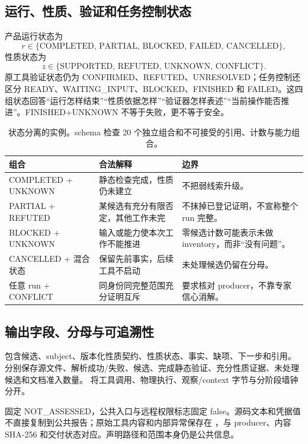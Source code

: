 \subsection{运行、性质、验证和任务控制状态}
产品运行状态为
\begin{equation}
r\in\{\text{COMPLETED, PARTIAL, BLOCKED, FAILED, CANCELLED}\},
\end{equation}
性质状态为
\begin{equation}
z\in\{\text{SUPPORTED, REFUTED, UNKNOWN, CONFLICT}\}.
\end{equation}
原工具验证状态仍为 CONFIRMED、REFUTED、UNRESOLVED；任务控制还区分 READY、WAITING\_INPUT、BLOCKED、FINISHED 和 FAILED。这四组状态回答“运行怎样结束”“性质依据怎样”“验证器怎样表述”“当前操作能否推进”。FINISHED+UNKNOWN 不等于失败，更不等于安全。

\begin{table}[htbp]\centering
\begin{tabularx}{\textwidth}{L{28mm}L{33mm}Y}
\toprule 组合 & 合法解释 & 边界\\\midrule
COMPLETED + UNKNOWN & 静态检查完成，性质仍未建立 & 不把弱线索升级。\\
PARTIAL + REFUTED & 某候选有充分有限否定，其他工作未完 & 不抹掉已登记证明，不宣称整个 run 完整。\\
BLOCKED + UNKNOWN & 输入或能力使本次工作不能推进 & 零候选计数可能表示未做 inventory，而非“没有问题”。\\
CANCELLED + 混合状态 & 保留先前事实，后续工具不启动 & 未处理候选仍留在分母。\\
任意 run + CONFLICT & 同身份同完整范围充分证明互斥 & 要求核对 producer，不靠专家信心消解。\\
\bottomrule
\end{tabularx}
\caption{状态分离的实例。schema 检查 20 个独立组合和不可接受的引用、计数与能力组合。}
\end{table}

\subsection{输出字段、分母与可追溯性}
 包含候选、subject、版本化性质契约、性质状态、事实、缺项、下一步和引用。 分别保存源文件、解析成功/失败、候选、完成静态验证、充分性质证据、未处理候选和文档准入数量。 将工具调用、物理执行、观察/context 字节与分阶段墙钟分开。

 固定 NOT\_ASSESSED，公共入口与远程权限标志固定 false。源码文本和凭据值不直接复制到公共报告；原始工具内容和内部异常保存在 ，与 producer、内容 SHA-256 和交付状态对应。声明路径和范围本身仍是公共信息。

